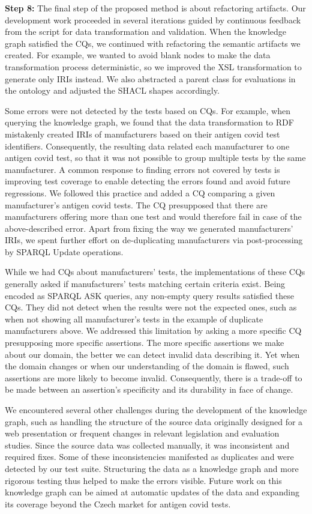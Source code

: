 \documentclass[
]{ceurart}
\begin{document}
\textbf{Step 8:} The final step of the proposed method is about refactoring artifacts. Our development work proceeded in several iterations guided by continuous feedback from the script for data transformation and validation. When the knowledge graph satisfied the CQs, we continued with refactoring the semantic artifacts we created. For example, we wanted to avoid blank nodes to make the data transformation process deterministic, so we improved the XSL transformation to generate only IRIs instead. We also abstracted a parent class for evaluations in the ontology and adjusted the SHACL shapes accordingly.

Some errors were not detected by the tests based on CQs. For example, when querying the knowledge graph, we found that the data transformation to RDF mistakenly created IRIs of manufacturers based on their antigen covid test identifiers. Consequently, the resulting data related each manufacturer to one antigen covid test, so that it was not possible to group multiple tests by the same manufacturer. A common response to finding errors not covered by tests is improving test coverage to enable detecting the errors found and avoid future regressions. We followed this practice and added a CQ comparing a given manufacturer's antigen covid tests. The CQ presupposed that there are manufacturers offering more than one test and would therefore fail in case of the above-described error. Apart from fixing the way we generated manufacturers' IRIs, we spent further effort on de-duplicating manufacturers via post-processing by SPARQL Update operations.

While we had CQs about manufacturers' tests, the implementations of these CQs generally asked if manufacturers' tests matching certain criteria exist. Being encoded as SPARQL ASK queries, any non-empty query results satisfied these CQs. They did not detect when the results were not the expected ones, such as when not showing all manufacturer's tests in the example of duplicate manufacturers above. We addressed this limitation by asking a more specific CQ presupposing more specific assertions. The more specific assertions we make about our domain, the better we can detect invalid data describing it. Yet when the domain changes or when our understanding of the domain is flawed, such assertions are more likely to become invalid. Consequently, there is a trade-off to be made between an assertion's specificity and its durability in face of change.

We encountered several other challenges during the development of the knowledge graph, such as handling the structure of the source data originally designed for a web presentation or frequent changes in relevant legislation and evaluation studies. Since the source data was collected manually, it was inconsistent and required fixes. Some of these inconsistencies manifested as duplicates and were detected by our test suite. Structuring the data as a knowledge graph and more rigorous testing thus helped to make the errors visible. Future work on this knowledge graph can be aimed at automatic updates of the data and expanding its coverage beyond the Czech market for antigen covid tests.
\end{document}
